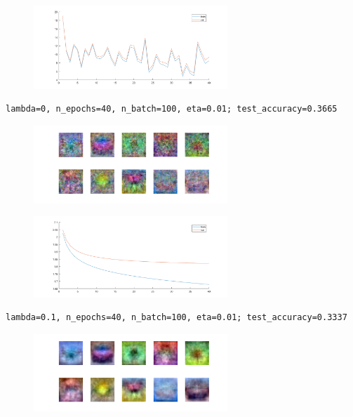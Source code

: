 \begin{figure}[h!]
	\centering
	\includegraphics[width=0.65\textwidth]{../Result_Pics/a1.png}
\end{figure}

\newpage
\begin{verbatim}
lambda=0, n_epochs=40, n_batch=100, eta=0.01; test_accuracy=0.3665
\end{verbatim}

\begin{figure}[h!]
	\centering
	\includegraphics[width=0.65\textwidth]{../Result_Pics/w2.png}
\end{figure}

\begin{figure}[h!]
	\centering
	\includegraphics[width=0.65\textwidth]{../Result_Pics/a2.png}
\end{figure}

\begin{verbatim}
lambda=0.1, n_epochs=40, n_batch=100, eta=0.01; test_accuracy=0.3337
\end{verbatim}

\begin{figure}[h!]
	\centering
	\includegraphics[width=0.65\textwidth]{../Result_Pics/w3.png}
\end{figure}

